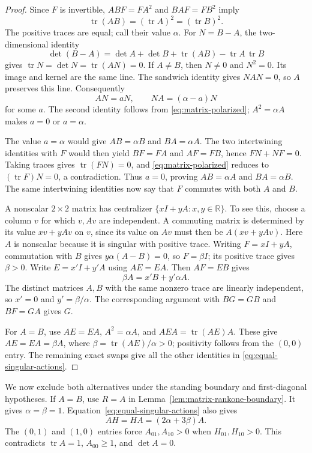 \documentclass[11pt,a4paper]{article}
\newcommand{\R}{\mathbb R}
\newcommand{\tr}{\operatorname{tr}}
\begin{document}
\begin{proof}
Since $F$ is invertible, $ABF=FA^2$ and $BAF=FB^2$ imply
\[
\tr(AB)=(\tr A)^2=(\tr B)^2.
\]
The positive traces are equal; call their value $\alpha$.
For $N=B-A$, the two-dimensional identity
\[
\det(B-A)=\det A+\det B+\tr(AB)-\tr A\,\tr B
\]
gives $\tr N=\det N=\tr(AN)=0$. If $A\ne B$, then
$N\ne0$ and $N^2=0$. Its image and kernel are the same line.
The sandwich identity gives $NAN=0$, so $A$ preserves this line.
Consequently
\[
AN=aN,\qquad NA=(\alpha-a)N
\]
for some $a$. The second identity follows from
\eqref{eq:matrix-polarized}; $A^2=\alpha A$ makes $a=0$ or
$a=\alpha$.

The value $a=\alpha$ would give $AB=\alpha B$ and $BA=\alpha A$.
The two intertwining identities with $F$ would then yield
$BF=FA$ and $AF=FB$, hence $FN+NF=0$.
Taking traces gives $\tr(FN)=0$, and
\eqref{eq:matrix-polarized} reduces to $(\tr F)N=0$, a contradiction.
Thus $a=0$, proving $AB=\alpha A$ and $BA=\alpha B$.
The same intertwining identities now say that $F$ commutes with both
$A$ and $B$.

A nonscalar $2\times2$ matrix has centralizer $\{xI+yA:x,y\in\R\}$.
To see this, choose a column $v$ for which $v,Av$ are independent.
A commuting matrix is determined by its value $xv+yAv$ on $v$, since
its value on $Av$ must then be $A(xv+yAv)$.
Here $A$ is nonscalar because it is singular with positive trace.
Writing $F=xI+yA$, commutation with $B$ gives
$y\alpha(A-B)=0$, so $F=\beta I$; its positive trace gives $\beta>0$.
Write $E=x'I+y'A$ using $AE=EA$. Then $AF=EB$ gives
\[
\beta A=x'B+y'\alpha A.
\]
The distinct matrices $A,B$ with the same nonzero trace are linearly
independent, so $x'=0$ and $y'=\beta/\alpha$.
The corresponding argument with $BG=GB$ and $BF=GA$ gives $G$.

For $A=B$, use $AE=EA$, $A^2=\alpha A$, and
$AEA=\tr(AE)A$. These give $AE=EA=\beta A$, where
$\beta=\tr(AE)/\alpha>0$; positivity follows from the $(0,0)$ entry.
The remaining exact swaps give all the other identities in
\eqref{eq:equal-singular-actions}.
\end{proof}

We now exclude both alternatives under the standing boundary and
first-diagonal hypotheses. If $A=B$, use $R=A$ in
Lemma~\ref{lem:matrix-rankone-boundary}. It gives
$\alpha=\beta=1$. Equation~\eqref{eq:equal-singular-actions} also gives
\[
AH=HA=(2\alpha+3\beta)A.
\]
The $(0,1)$ and $(1,0)$ entries force $A_{01},A_{10}>0$ when
$H_{01},H_{10}>0$. This contradicts
$\tr A=1$, $A_{00}\ge1$, and $\det A=0$.
\end{document}

